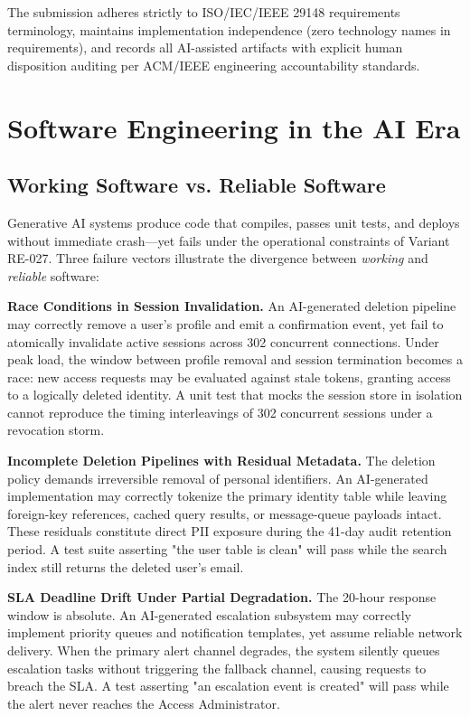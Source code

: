 \documentclass[10pt,a4paper]{article}
\begin{document}
The submission adheres strictly to ISO/IEC/IEEE 29148 requirements terminology, maintains implementation independence (zero technology names in requirements), and records all AI-assisted artifacts with explicit human disposition auditing per ACM/IEEE engineering accountability standards.

\section{Software Engineering in the AI Era}

\subsection{Working Software vs. Reliable Software}

Generative AI systems produce code that compiles, passes unit tests, and deploys without immediate crash---yet fails under the operational constraints of Variant RE-027. Three failure vectors illustrate the divergence between \textit{working} and \textit{reliable} software:

\textbf{Race Conditions in Session Invalidation.} An AI-generated deletion pipeline may correctly remove a user's profile and emit a confirmation event, yet fail to atomically invalidate active sessions across 302 concurrent connections. Under peak load, the window between profile removal and session termination becomes a race: new access requests may be evaluated against stale tokens, granting access to a logically deleted identity. A unit test that mocks the session store in isolation cannot reproduce the timing interleavings of 302 concurrent sessions under a revocation storm.

\textbf{Incomplete Deletion Pipelines with Residual Metadata.} The deletion policy demands irreversible removal of personal identifiers. An AI-generated implementation may correctly tokenize the primary identity table while leaving foreign-key references, cached query results, or message-queue payloads intact. These residuals constitute direct PII exposure during the 41-day audit retention period. A test suite asserting "the user table is clean" will pass while the search index still returns the deleted user's email.

\textbf{SLA Deadline Drift Under Partial Degradation.} The 20-hour response window is absolute. An AI-generated escalation subsystem may correctly implement priority queues and notification templates, yet assume reliable network delivery. When the primary alert channel degrades, the system silently queues escalation tasks without triggering the fallback channel, causing requests to breach the SLA. A test asserting "an escalation event is created" will pass while the alert never reaches the Access Administrator.
\end{document}
